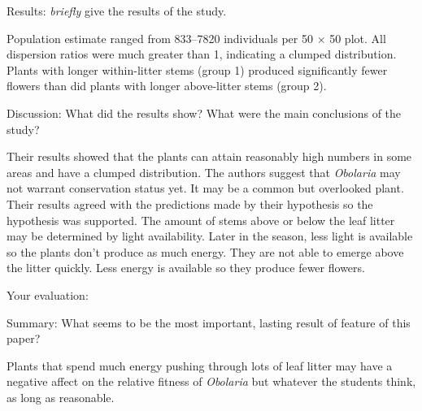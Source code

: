 \documentclass[12pt, hidelinks, addpoints]{exam}
\newcommand*\AnswerBox[2]{%
    \parbox[t][#1]{0.92\textwidth}{%
    \begin{solution}#2\end{solution}}
}
\newlength{\basespace}
\begin{document}
\begin{questions}
\newpage

\question[1]
Results: \emph{briefly} give the results of the study.

\AnswerBox{2\basespace}{%
Population estimate ranged from 833--7820 individuals per 50 $\times$ 50 plot. All dispersion ratios were much greater than 1, indicating a clumped distribution.  Plants with longer within-litter stems (group 1) produced significantly fewer flowers than did plants with longer above-litter stems (group 2). 
}


\question[1]
Discussion: What did the results show? What were the main conclusions of the study?

\AnswerBox{2\basespace}{%
	Their results showed that the plants can attain reasonably high numbers in some areas and have a clumped distribution. The authors suggest that \textit{Obolaria} may not warrant conservation status yet. It may be a common but overlooked plant. Their results agreed with the predictions made by their hypothesis so the hypothesis was supported.  The amount of stems above or below the leaf litter may be determined by light availability. Later in the season, less light is available so the plants don't produce as much energy. They are not able to emerge above the litter quickly. Less energy is available so they produce fewer flowers.
}

\question[2]
Your evaluation: 

\question[1]
Summary: What seems to be the most important, lasting result of feature of this paper?

\AnswerBox{\basespace}{%
Plants that spend much energy pushing through lots of leaf litter may have a negative affect on the relative fitness of \textit{Obolaria} but whatever the students think, as long as reasonable.
}


\end{questions}
\end{document}
